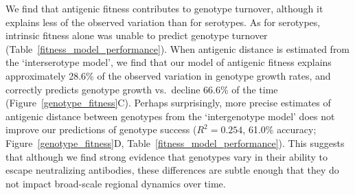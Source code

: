 \documentclass[11pt,oneside,letterpaper]{article}
\begin{document}
We find that antigenic fitness contributes to genotype turnover, although it explains less of the observed variation than for serotypes.
As for serotypes, intrinsic fitness alone was unable to predict genotype turnover (Table~\ref{fitness_model_performance}).
When antigenic distance is estimated from the `interserotype model', we find that our model of antigenic fitness explains approximately 28.6\% of the observed variation in genotype growth rates, and correctly predicts genotype growth vs.\ decline 66.6\% of the time (Figure~\ref{genotype_fitness}C).
Perhaps surprisingly, more precise estimates of antigenic distance between genotypes from the `intergenotype model' does not improve our predictions of genotype success ($R^2 = 0.254$, 61.0\% accuracy; Figure~\ref{genotype_fitness}D, Table~\ref{fitness_model_performance}).
This suggests that although we find strong evidence that genotypes vary in their ability to escape neutralizing antibodies, these differences are subtle enough that they do not impact broad-scale regional dynamics over time.
\end{document}
